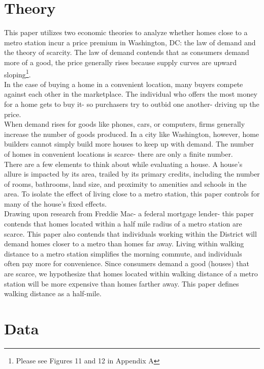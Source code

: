 \documentclass[12pt]{report}
\newcommand\tab[1][.60cm]{\hspace*{#1}}
\begin{document}
\section*{Theory}
This paper utilizes two economic theories to analyze whether homes close to a metro station incur a price premium in Washington, DC: the law of demand and the theory of scarcity. The law of demand contends that as consumers demand more of a good, the price generally rises because supply curves are upward sloping\footnote{Please see Figures 11 and 12 in Appendix A}.\\ \tab In the case of buying a home in a convenient location, many buyers compete against each other in the marketplace. The individual who offers the most money for a home gets to buy it- so purchasers try to outbid one another- driving up the price.\\ \tab When demand rises for goods like phones, cars, or computers, firms generally increase the number of goods produced. In a city like Washington, however, home builders cannot simply build more houses to keep up with demand. The number of homes in convenient locations is scarce- there are only a finite number.\\
\tab There are a few elements to think about while evaluating a house. A house's allure is impacted by its area, trailed by its primary credits, including the number of rooms, bathrooms, land size, and proximity to amenities and schools in the area. To isolate the effect of living close to a metro station, this paper controls for many of the house's fixed effects.\\
\tab Drawing upon research from Freddie Mac- a federal mortgage lender- this paper contends that homes located within a half mile radius of a metro station are scarce. This paper also contends that individuals working within the District will demand homes closer to a metro than homes far away. Living within walking distance to a metro station simplifies the morning commute, and individuals often pay more for convenience. Since consumers demand a good (houses) that are scarce, we hypothesize that homes located within walking distance of a metro station will be more expensive than homes farther away. This paper defines walking distance as a half-mile.


\section*{Data}
\end{document}
